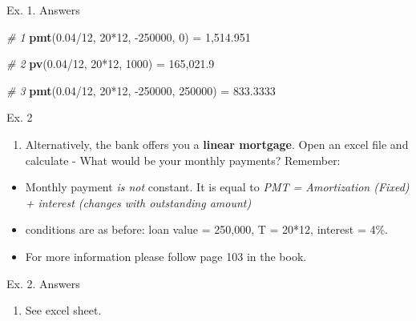 \documentclass[ignorenonframetext,]{beamer}
\newenvironment{Shaded}{\begin{snugshade}}{\end{snugshade}}
\newcommand{\KeywordTok}[1]{\textcolor[rgb]{0.13,0.29,0.53}{\textbf{{#1}}}}
\newcommand{\DecValTok}[1]{\textcolor[rgb]{0.00,0.00,0.81}{{#1}}}
\newcommand{\FloatTok}[1]{\textcolor[rgb]{0.00,0.00,0.81}{{#1}}}
\newcommand{\StringTok}[1]{\textcolor[rgb]{0.31,0.60,0.02}{{#1}}}
\newcommand{\CommentTok}[1]{\textcolor[rgb]{0.56,0.35,0.01}{\textit{{#1}}}}
\newcommand{\NormalTok}[1]{{#1}}
\providecommand{\tightlist}{%
\setlength{\itemsep}{0pt}\setlength{\parskip}{0pt}}
\begin{document}
\begin{frame}[fragile]{Ex. 1. Answers}

\begin{Shaded}
\begin{Highlighting}[]
\CommentTok{# 1 }
\KeywordTok{pmt}\NormalTok{(}\FloatTok{0.04}\NormalTok{/}\DecValTok{12}\NormalTok{, }\DecValTok{20}\NormalTok{*}\DecValTok{12}\NormalTok{, -}\DecValTok{250000}\NormalTok{, }\DecValTok{0}\NormalTok{)}
\NormalTok{=}\StringTok{ }\DecValTok{1}\NormalTok{,}\FloatTok{514.951}

\CommentTok{# 2}
\KeywordTok{pv}\NormalTok{(}\FloatTok{0.04}\NormalTok{/}\DecValTok{12}\NormalTok{, }\DecValTok{20}\NormalTok{*}\DecValTok{12}\NormalTok{, }\DecValTok{1000}\NormalTok{)}
\NormalTok{=}\StringTok{ }\DecValTok{165}\NormalTok{,}\FloatTok{021.9}

\CommentTok{# 3}
\KeywordTok{pmt}\NormalTok{(}\FloatTok{0.04}\NormalTok{/}\DecValTok{12}\NormalTok{, }\DecValTok{20}\NormalTok{*}\DecValTok{12}\NormalTok{, -}\DecValTok{250000}\NormalTok{, }\DecValTok{250000}\NormalTok{)}
\NormalTok{=}\StringTok{ }\FloatTok{833.3333}
\end{Highlighting}
\end{Shaded}

\end{frame}

\begin{frame}{Ex. 2}

\begin{enumerate}
\def\labelenumi{\arabic{enumi}.}
\tightlist
\item
  Alternatively, the bank offers you a \textbf{linear mortgage}. Open an
  excel file and calculate - What would be your monthly payments?
  Remember:
\end{enumerate}

\begin{itemize}
\tightlist
\item
  Monthly payment \emph{is not} constant. It is equal to \emph{PMT =
  Amortization (Fixed) + interest (changes with outstanding amount)}
\item
  conditions are as before: loan value = 250,000, T = 20*12, interest =
  4\%.
\item
  For more information please follow page 103 in the book.
\end{itemize}

\end{frame}

\begin{frame}{Ex. 2. Answers}

\begin{enumerate}
\def\labelenumi{\arabic{enumi}.}
\tightlist
\item
  See excel sheet.
\end{enumerate}

\end{frame}
\end{document}
